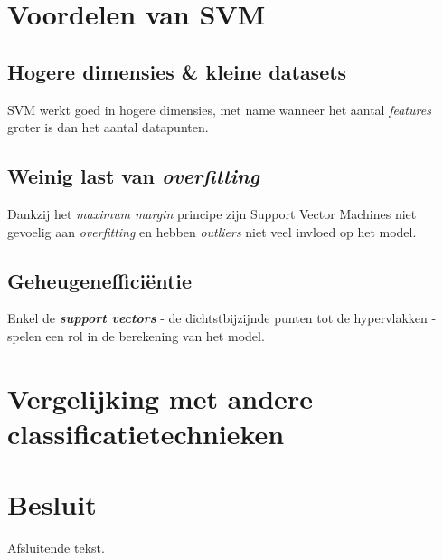 \documentclass[kulak]{kulakposter}
\begin{document}
\begin{multicols}{2}
\section{Voordelen van SVM}

\subsection{Hogere dimensies \& kleine datasets}

SVM werkt goed in hogere dimensies, met name wanneer het aantal \textit{features} groter is dan het aantal datapunten.

\subsection{Weinig last van \textit{overfitting}}

Dankzij het \textit{maximum margin} principe zijn Support Vector Machines niet gevoelig aan \textit{overfitting} en hebben \textit{outliers} niet veel invloed op het model.

\subsection{Geheugenefficiëntie}

Enkel de \textbf{\textit{support vectors}} - de dichtstbijzijnde punten tot de hypervlakken - spelen een rol in de berekening van het model.
	
	\columnbreak
	\section{Vergelijking met andere classificatietechnieken}
\end{multicols}


\section*{Besluit}
\begin{multicols}{2}\setlength{\columnseprule}{0pt}
Afsluitende tekst.
\end{multicols}

\nocite{mediumarticle}



\end{document}
